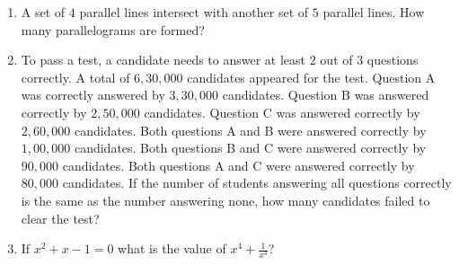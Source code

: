 \documentclass[journal,12pt,onecolumn]{IEEEtran}
\theoremstyle{remark}
\begin{document}
\begin{enumerate}
    \item A set of $4$ parallel lines intersect with another set of $5$ parallel lines. How many parallelograms are formed?
    
    \hfill{}
    \begin{enumerate}
    \end{enumerate}
    
    \item To pass a test, a candidate needs to answer at least $2$ out of $3$ questions correctly. A total of $6,30,000$ candidates appeared for the test. Question A was correctly answered by $3,30,000$ candidates. Question B was answered correctly by $2,50,000$ candidates. Question C was answered correctly by $2,60,000$ candidates. Both questions A and B were answered correctly by $1,00,000$ candidates. Both questions B and C were answered correctly by $90,000$ candidates. Both questions A and C were answered correctly by $80,000$ candidates. If the number of students answering all questions correctly is the same as the number answering none, how many candidates failed to clear the test?
    
    \hfill{}
    \begin{enumerate}
    \end{enumerate}

    \item If $x^{2}+x-1=0$ what is the value of $x^{4}+\frac{1}{x^{4}}$?
    
    \hfill{}
    \begin{enumerate}
    \end{enumerate}
    

\end{enumerate}
\end{document}
